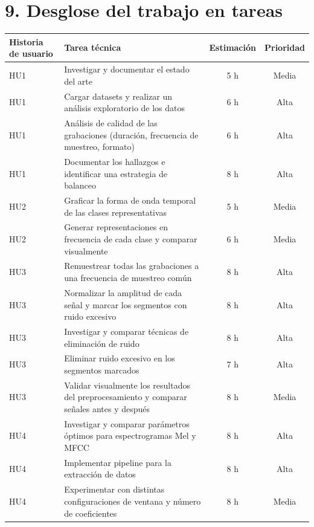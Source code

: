 \documentclass[
11pt, %
]{charter}
\begin{document}
\newpage

\section{9. Desglose del trabajo en tareas}
\label{sec:wbs}
\begin{table}[htpb]
\begin{tabularx}{\linewidth}{@{}|X|X|c|c|@{}}
\hline
\rowcolor[HTML]{C0C0C0}
Historia de usuario & Tarea técnica & Estimación & Prioridad \\ \hline
HU1 & Investigar y documentar el estado del arte                       & 5 h  & Media \\ \hline 
HU1 & Cargar datasets y realizar un análisis exploratorio de los datos & 6 h & Alta \\ \hline
HU1 & Análisis de calidad de las grabaciones (duración, frecuencia de muestreo, formato) & 6 h & Alta \\ \hline
HU1 & Documentar los hallazgos e identificar una estrategia de balanceo & 8 h & Alta \\ \hline
HU2 & Graficar la forma de onda temporal de las clases representativas & 5 h & Media \\ \hline
HU2 & Generar representaciones en frecuencia de cada clase y comparar visualmente & 6 h & Media \\ \hline
HU3 & Remuestrear todas las grabaciones a una frecuencia de muestreo común & 8 h & Alta \\ \hline
HU3 & Normalizar la amplitud de cada señal y marcar los segmentos con ruido excesivo & 8 h & Alta \\ \hline
HU3 & Investigar y comparar técnicas de eliminación de ruido & 8 h & Alta \\ \hline
HU3 & Eliminar ruido excesivo en los segmentos marcados & 7 h & Alta \\ \hline
HU3 & Validar visualmente los resultados del preprocesamiento y comparar señales antes y después & 8 h & Media \\ \hline
HU4 & Investigar y comparar parámetros óptimos para espectrogramas Mel y MFCC & 8 h & Alta \\ \hline
HU4 & Implementar pipeline para la extracción de datos & 8 h & Alta \\ \hline
HU4 & Experimentar con distintas configuraciones de ventana y número de coeficientes & 8 h & Media \\ \hline
\end{tabularx}
\end{table}
\end{document}
